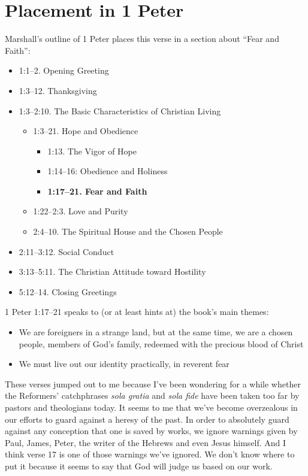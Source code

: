 \section{Placement in 1 Peter}

Marshall's outline of 1 Peter places this verse in a section about \enquote{Fear
and Faith}:

\begin{itemize}
    \item 1:1--2. Opening Greeting
    \item 1:3--12. Thanksgiving
    \item 1:3--2:10. The Basic Characteristics of Christian Living
        \begin{itemize}
            \item 1:3--21. Hope and Obedience
                \begin{itemize}
                    \item 1:13. The Vigor of Hope
                    \item 1:14--16: Obedience and Holiness
                    \item \textbf{1:17--21. Fear and Faith}
                \end{itemize}
            \item 1:22--2:3. Love and Purity
            \item 2:4--10. The Spiritual House and the Chosen People
        \end{itemize}
    \item 2:11--3:12. Social Conduct
    \item 3:13--5:11. The Christian Attitude toward Hostility
    \item 5:12--14. Closing Greetings
        \autocite[Outline of 1 Peter]{marshall:1991}
\end{itemize}

1 Peter 1:17--21 speaks to (or at least hints at) the book's main themes:

\begin{itemize}
    \item We are foreigners in a strange land, but at the same time, we are a
        chosen people, members of God's family, redeemed with the precious blood
        of Christ
    \item We must live out our identity practically, in reverent fear
\end{itemize}

These verses jumped out to me because I've been wondering for a while whether
the Reformers' catchphrases \emph{sola gratia} and \emph{sola fide} have been
taken too far by pastors and theologians today. It seems to me that we've become
overzealous in our efforts to guard against a heresy of the past. In order to
absolutely guard against any conception that one is saved by works, we ignore
warnings given by Paul, James, Peter, the writer of the Hebrews and even Jesus
himself. And I think verse 17 is one of those warnings we've ignored. We don't
know where to put it because it seems to say that God will judge us based on our
work.

